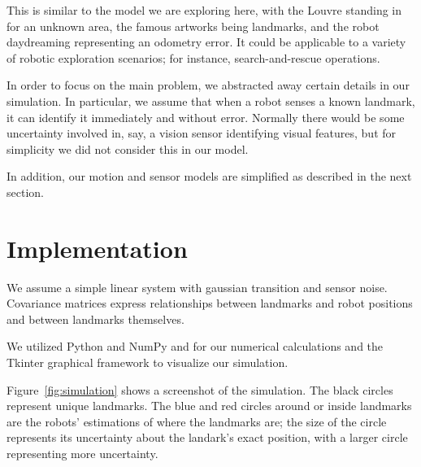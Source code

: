 \documentclass[prodmode,acmtecs]{acmsmall} %
\begin{document}
This is similar to the model we are exploring here, with the Louvre standing in for an unknown area, the famous artworks being landmarks, and the robot daydreaming representing an odometry error.  It could be applicable to a variety of robotic exploration scenarios; for instance, search-and-rescue operations.

In order to focus on the main problem, we abstracted away certain details in our simulation.  In particular, we assume that when a robot senses a known landmark, it can identify it immediately and without error.  Normally there would be some uncertainty involved in, say, a vision sensor identifying visual features, but for simplicity we did not consider this in our model.

In addition, our motion and sensor models are simplified as described in the next section.

\section{Implementation}

We assume a simple linear system with gaussian transition and sensor noise.  Covariance matrices express relationships between landmarks and robot positions and between landmarks themselves.  

We utilized Python and NumPy and for our numerical calculations and the Tkinter graphical framework to visualize our simulation.

Figure~\ref{fig:simulation} shows a screenshot of the simulation.  The black circles represent unique landmarks.  The blue and red circles around or inside landmarks are the robots' estimations of where the landmarks are; the size of the circle represents its uncertainty about the landark's exact position, with a larger circle representing more uncertainty.
\end{document}

